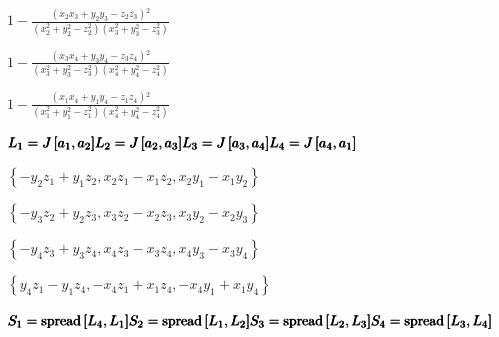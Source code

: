 \documentclass{article}
\begin{document}
\begin{doublespace}
\noindent\(1-\frac{\left(x_2 x_3+y_2 y_3-z_2 z_3\right){}^2}{\left(x_2^2+y_2^2-z_2^2\right) \left(x_3^2+y_3^2-z_3^2\right)}\)
\end{doublespace}

\begin{doublespace}
\noindent\(1-\frac{\left(x_3 x_4+y_3 y_4-z_3 z_4\right){}^2}{\left(x_3^2+y_3^2-z_3^2\right) \left(x_4^2+y_4^2-z_4^2\right)}\)
\end{doublespace}

\begin{doublespace}
\noindent\(1-\frac{\left(x_1 x_4+y_1 y_4-z_1 z_4\right){}^2}{\left(x_1^2+y_1^2-z_1^2\right) \left(x_4^2+y_4^2-z_4^2\right)}\)
\end{doublespace}

\begin{doublespace}
\noindent\(\pmb{L_1 = J\left[a_1,a_2\right]}\\
\pmb{L_2 = J\left[a_2,a_3\right]}\\
\pmb{L_3 = J\left[a_3,a_4\right]}\\
\pmb{L_4 = J\left[a_4,a_1\right]}\)
\end{doublespace}

\begin{doublespace}
\noindent\(\left\{-y_2 z_1+y_1 z_2,x_2 z_1-x_1 z_2,x_2 y_1-x_1 y_2\right\}\)
\end{doublespace}

\begin{doublespace}
\noindent\(\left\{-y_3 z_2+y_2 z_3,x_3 z_2-x_2 z_3,x_3 y_2-x_2 y_3\right\}\)
\end{doublespace}

\begin{doublespace}
\noindent\(\left\{-y_4 z_3+y_3 z_4,x_4 z_3-x_3 z_4,x_4 y_3-x_3 y_4\right\}\)
\end{doublespace}

\begin{doublespace}
\noindent\(\left\{y_4 z_1-y_1 z_4,-x_4 z_1+x_1 z_4,-x_4 y_1+x_1 y_4\right\}\)
\end{doublespace}

\begin{doublespace}
\noindent\(\pmb{S_1=\text{spread}\left[L_4,L_1\right]}\\
\pmb{S_2=\text{spread}\left[L_1,L_2\right]}\\
\pmb{S_3=\text{spread}\left[L_2,L_3\right]}\\
\pmb{S_4=\text{spread}\left[L_3,L_4\right]}\)
\end{doublespace}
\end{document}
